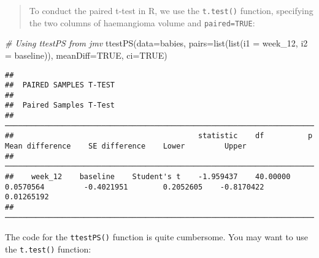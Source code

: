 \documentclass[
]{memoir}
\newenvironment{Shaded}{\begin{snugshade}}{\end{snugshade}}
\newcommand{\AttributeTok}[1]{\textcolor[rgb]{0.77,0.63,0.00}{#1}}
\newcommand{\CommentTok}[1]{\textcolor[rgb]{0.56,0.35,0.01}{\textit{#1}}}
\newcommand{\ConstantTok}[1]{\textcolor[rgb]{0.00,0.00,0.00}{#1}}
\newcommand{\FunctionTok}[1]{\textcolor[rgb]{0.00,0.00,0.00}{#1}}
\newcommand{\NormalTok}[1]{#1}
\newcommand{\SpecialCharTok}[1]{\textcolor[rgb]{0.00,0.00,0.00}{#1}}
\newcommand{\StringTok}[1]{\textcolor[rgb]{0.31,0.60,0.02}{#1}}
\begin{document}
\begin{quote}
To conduct the paired t-test in R, we use the \texttt{t.test()} function, specifying the two columns of haemangioma volume and \texttt{paired=TRUE}:
\end{quote}

\begin{Shaded}
\begin{Highlighting}[]
\CommentTok{\# Using ttestPS from jmv}
\FunctionTok{ttestPS}\NormalTok{(}\AttributeTok{data=}\NormalTok{babies, }\AttributeTok{pairs=}\FunctionTok{list}\NormalTok{(}\FunctionTok{list}\NormalTok{(}\AttributeTok{i1 =} \StringTok{\textquotesingle{}week\_12\textquotesingle{}}\NormalTok{, }\AttributeTok{i2 =} \StringTok{\textquotesingle{}baseline\textquotesingle{}}\NormalTok{)), }\AttributeTok{meanDiff=}\ConstantTok{TRUE}\NormalTok{, }\AttributeTok{ci=}\ConstantTok{TRUE}\NormalTok{)}
\end{Highlighting}
\end{Shaded}

\begin{verbatim}
## 
##  PAIRED SAMPLES T-TEST
## 
##  Paired Samples T-Test                                                                                                                        
##  ──────────────────────────────────────────────────────────────────────────────────────────────────────────────────────────────────────────── 
##                                          statistic    df          p            Mean difference    SE difference    Lower         Upper        
##  ──────────────────────────────────────────────────────────────────────────────────────────────────────────────────────────────────────────── 
##    week_12    baseline    Student's t    -1.959437    40.00000    0.0570564         -0.4021951        0.2052605    -0.8170422    0.01265192   
##  ────────────────────────────────────────────────────────────────────────────────────────────────────────────────────────────────────────────
\end{verbatim}

The code for the \texttt{ttestPS()} function is quite cumbersome. You may want to use the \texttt{t.test()} function:

\begin{Shaded}
\end{Shaded}
\end{document}
